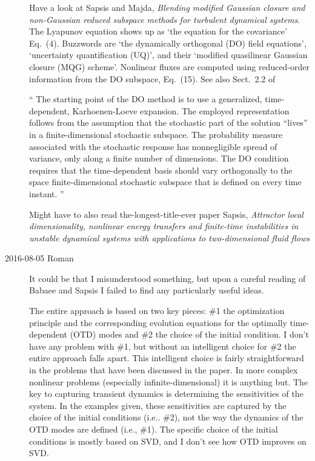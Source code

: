 \begin{description}
Have a look at Sapsis and Majda, {\em Blending modified
{Gaussian} closure and non-{Gaussian} reduced subspace methods for
turbulent dynamical systems}. The Lyapunov equation shows up as `the
equation for the covariance' Eq.~(4).
                                                    \toCB
Buzzwords are `the dynamically orthogonal (DO) field equations', `uncertainty quantification
(UQ)', and their  `modified quasilinear Gaussian closure (MQG) scheme'.
Nonlinear fluxes are computed using reduced-order information from the
DO subspace, Eq.~(15). See also Sect.~2.2 of

``
The starting point of the DO method is to use a generalized,
time-dependent, Karhoenen-Loeve expansion. The employed representation
follows from the assumption that the stochastic part of the solution
``lives'' in a finite-dimensional stochastic subspace. The probability
measure associated with the stochastic response has nonnegligible spread
of variance, only along a finite number of dimensions. The DO condition
requires that the time-dependent basis should vary orthogonally to the
space finite-dimensional stochastic subspace that is defined on every
time instant.
''

Might have to also read the-longest-title-ever paper
Sapsis,
{\em Attractor local dimensionality, nonlinear energy transfers
and finite-time instabilities in unstable dynamical systems with
applications to two-dimensional fluid flows}

\item[2016-08-05 Roman]
It could be that I misunderstood something, but upon a careful reading of Babaee and Sapsis I failed to find any particularly useful ideas.

The entire approach is based on two key pieces: \#1 the optimization principle and the corresponding evolution equations for the optimally time-dependent (OTD) modes and \#2 the choice of the initial condition. I don't have any problem with \#1, but without an intelligent choice for \#2 the entire approach falls apart. This intelligent choice is fairly straightforward in the problems that have been discussed in the paper. In more complex nonlinear problems (especially infinite-dimensional) it is anything but. The key to capturing transient dynamics is determining the sensitivities of the system. In the examples given, these sensitivities are captured by the choice of the initial conditions (i.e.. \#2), not the way the dynamics of the OTD modes are defined (i.e., \#1). The specific choice of the initial conditions is mostly based on SVD, and I don't see how OTD improves on SVD.


\end{description}
